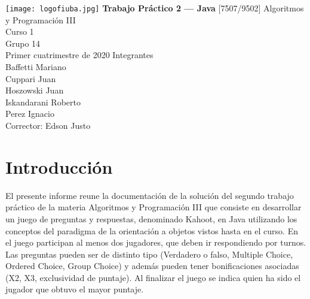 \documentclass[titlepage,a4paper]{article}
\begin{document}
\begin{titlepage} %
	\hfill\texttt{[image: logofiuba.jpg]}
    \centering
    \vfill
    \Huge \textbf{Trabajo Práctico 2 — Java}
    \vskip2cm
    \Large [7507/9502] Algoritmos y Programación III\\
    Curso 1 \\ %
    Grupo 14 \\
    Primer cuatrimestre de 2020 
    \vfill
    Integrantes\\[1\baselineskip]
    
    Baffetti Mariano\\
    Cuppari Juan\\
    Hoszowski Juan\\
    Iskandarani Roberto\\
    Perez Ignacio\\
    \vfill
    Corrector: Edson Justo
    \vfill
\end{titlepage}

\tableofcontents %
\newpage

\section{Introducción}\label{sec:intro}
El presente informe reune la documentación de la solución del segundo trabajo práctico de la materia Algoritmos y Programación III que consiste en desarrollar un juego de preguntas y respuestas, denominado Kahoot, en Java utilizando los conceptos del paradigma de la orientación a objetos vistos hasta en el curso. En el juego participan al menos dos jugadores, que deben ir respondiendo por turnos. Las preguntas pueden ser de distinto tipo (Verdadero o falso, Multiple Choice, Ordered Choice, Group Choice) y además pueden tener bonificaciones asociadas (X2, X3, exclusividad de puntaje). Al finalizar el juego se indica quien ha sido el jugador que obtuvo el mayor puntaje.
\end{document}
